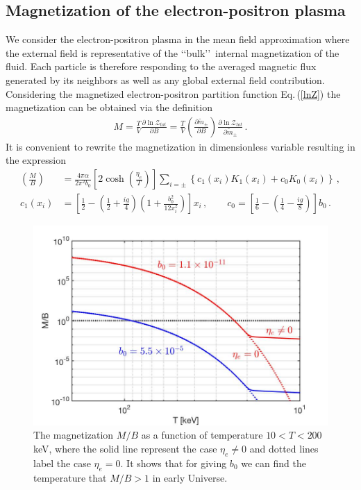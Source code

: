 \documentclass[universe,article,submit,moreauthors,pdftex,a4paper]{Definitions/mdpi}
\newcommand{\req}[1]{Eq.\,(\ref{#1})}
\begin{document}
\subsection{Magnetization of the electron-positron plasma}\label{sec:Magnetization}
\noindent We consider the electron-positron plasma in the mean field approximation where the external field is representative of the \lq\lq bulk\rq\rq\ internal magnetization of the fluid. Each particle is therefore responding to the averaged magnetic flux generated by its neighbors as well as any global external field contribution. Considering the magnetized electron-positron partition function \req{lnZ} the magnetization can be obtained via the definition
\begin{align}
M=\frac{T}{V}\frac{\partial \ln\mathcal{Z}_{tot}}{\partial B}=\frac{T}{V}\left(\frac{\partial\tilde m_\pm}{\partial B}\right)\frac{\partial \ln\mathcal{Z}_{tot}}{\partial\tilde m_\pm}\,.
\end{align}
It is convenient to rewrite the magnetization in dimensionless variable resulting in the expression
\begin{align}\label{Magnetization}
 \left(\frac{M}{B}\right)&=\frac{4\pi\alpha}{2\pi^2b_0}\left[2\cosh\left(\frac{\eta_{e}}{T}\right)\right]\sum_{i=\pm}\left\{c_{1}(x_{i})K_1(x_i)+c_{0}K_0(x_i)\right\}\,,\\
 c_{1}(x_{i}) &= \left[\frac{1}{2}-\left(\frac{1}{2}+\frac{ig}{4}\right)\left(1+\frac{b^2_0}{12x^2_i}\right)\right]x_i\,,\qquad c_{0} = \left[\frac{1}{6}-\left(\frac{1}{4}-\frac{ig}{8}\right)\right]b_0\,.
\end{align}

\begin{figure}[t]
\centering
\includegraphics[width=\textwidth]{./plots/MagnetizationFinal_200keV.jpg}
\caption{The magnetization $M/B$ as a function of temperature $10<T<200$ keV, where the solid line represent the case $\eta_e\neq0$ and dotted lines label the case $\eta_e=0$. It shows that for giving $b_0$ we can find the temperature that $M/B>1$ in early Universe.}
\label{Case2_fig} 
\end{figure}
\end{document}
